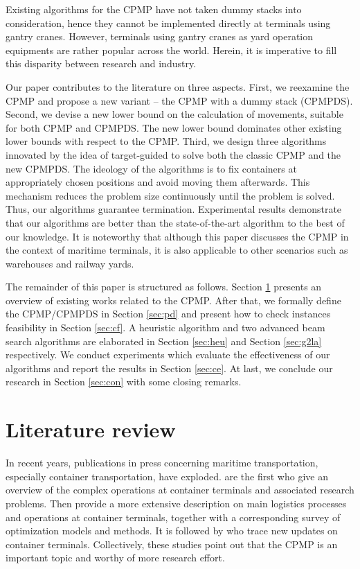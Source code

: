 \documentclass[review,3p,times,authoryear,12pt]{elsarticle}
\begin{document}
Existing algorithms for the CPMP have not taken dummy stacks into consideration, hence they cannot be implemented directly at terminals using gantry cranes. However, terminals using gantry cranes as yard operation equipments are rather popular across the world. Herein, it is imperative to fill this disparity between research and industry.

Our paper contributes to the literature on three aspects. First, we reexamine the CPMP and propose a new variant -- the CPMP with a dummy stack (CPMPDS). Second, we devise a new lower bound on the calculation of movements, suitable for both CPMP and CPMPDS. The new lower bound dominates other existing lower bounds with respect to the CPMP. Third, we design three algorithms innovated by the idea of target-guided to solve both the classic CPMP and the new CPMPDS. The ideology of the algorithms is to fix containers at appropriately chosen positions and avoid moving them afterwards. This mechanism reduces the problem size continuously until the problem is solved. Thus, our algorithms guarantee termination. Experimental results demonstrate that our algorithms are better than the state-of-the-art algorithm to the best of our knowledge. It is noteworthy that although this paper discusses the CPMP in the context of maritime terminals, it is also applicable to other scenarios such as warehouses and railway yards.

The remainder of this paper is structured as follows. Section \ref{sec:litreview} presents an overview of existing works related to the CPMP. After that, we formally define the CPMP/CPMPDS in Section \ref{sec:pd} and present how to check instances feasibility in Section \ref{sec:cf}. A heuristic algorithm and two advanced beam search algorithms are elaborated in Section \ref{sec:heu} and Section \ref{sec:g2la} respectively. We conduct experiments which evaluate the effectiveness of our algorithms and report the results in Section \ref{sec:ce}. At last, we conclude our research in Section \ref{sec:con} with some closing remarks.

\section{Literature review}
\label{sec:litreview}

In recent years, publications in press concerning maritime transportation, especially container transportation, have exploded. \cite{Vis2003} are the first who give an overview of the complex operations at container terminals and associated research problems.
Then \cite{Steenken2004} provide a more extensive description on main logistics processes and operations at container terminals, together with a corresponding survey of optimization models and methods. It is followed by \cite{Stahlbock2008} who trace new updates on container terminals.
Collectively, these studies point out that the CPMP is an important topic and worthy of more research effort.
\end{document}
